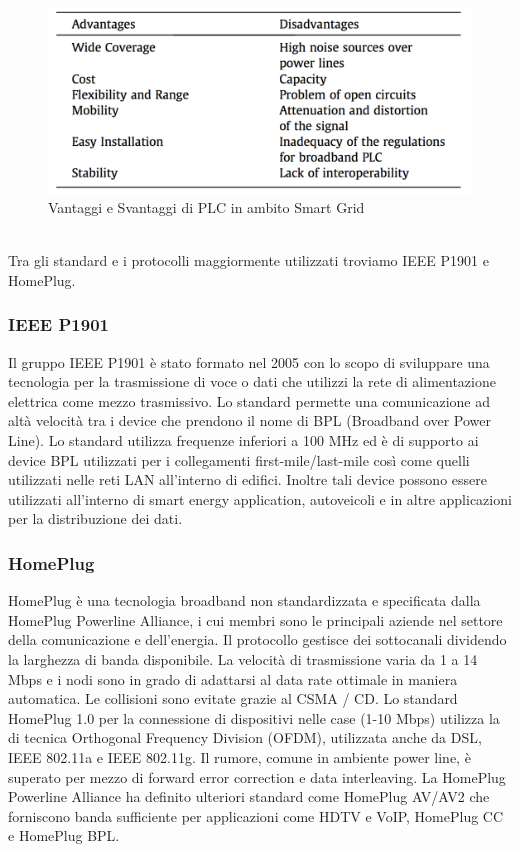 \begin{figure}[h]
	\centering
	\includegraphics[scale=0.350]{imgs/vs_plc.png}
	\caption{Vantaggi e Svantaggi di PLC in ambito Smart Grid} \label{fig:vs_plc}
\end{figure}\\
Tra gli standard e i protocolli maggiormente utilizzati troviamo IEEE P1901 e HomePlug.
\newpage
\subsubsection{IEEE P1901}
Il gruppo IEEE P1901 è stato formato nel 2005 con lo scopo di sviluppare una tecnologia per la trasmissione di voce o dati che utilizzi la rete di alimentazione elettrica come mezzo trasmissivo. Lo standard permette una comunicazione ad altà velocità tra i device che prendono il nome di BPL (Broadband over Power Line). Lo standard utilizza frequenze inferiori a 100 MHz ed è di supporto ai device BPL utilizzati per i collegamenti first-mile/last-mile così come quelli utilizzati nelle reti LAN all'interno di edifici. Inoltre tali device possono essere utilizzati all'interno di smart energy application, autoveicoli e in altre applicazioni per la distribuzione dei dati.
\subsubsection{HomePlug}
HomePlug è una tecnologia broadband non standardizzata e specificata dalla HomePlug Powerline Alliance, i cui membri sono le principali aziende nel settore della comunicazione e dell'energia. Il protocollo gestisce dei sottocanali dividendo la larghezza di banda disponibile. La velocità di trasmissione varia da 1 a 14 Mbps e i nodi sono in grado di adattarsi al data rate ottimale in maniera automatica. Le collisioni sono evitate grazie al CSMA / CD. Lo standard HomePlug 1.0 per la connessione di dispositivi nelle case (1-10 Mbps) utilizza la di tecnica Orthogonal Frequency Division (OFDM), utilizzata anche da DSL, IEEE 802.11a e IEEE 802.11g. Il rumore, comune in ambiente power line, è superato per mezzo di forward error correction e data interleaving. La HomePlug Powerline Alliance ha definito ulteriori standard come HomePlug AV/AV2 che forniscono banda sufficiente per applicazioni come HDTV e VoIP, HomePlug CC e HomePlug BPL.
